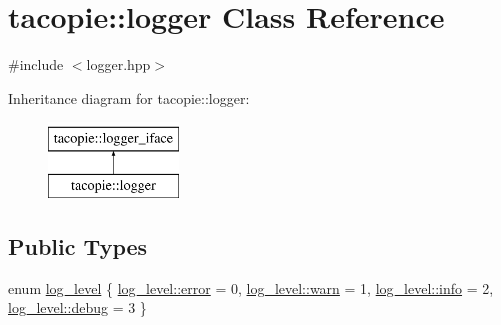 \hypertarget{classtacopie_1_1logger}{}\section{tacopie\+:\+:logger Class Reference}
\label{classtacopie_1_1logger}


{\ttfamily \#include $<$logger.\+hpp$>$}

Inheritance diagram for tacopie\+:\+:logger\+:\begin{figure}[H]
\begin{center}
\leavevmode
\includegraphics[height=2.000000cm]{classtacopie_1_1logger}
\end{center}
\end{figure}
\subsection*{Public Types}
\begin{DoxyCompactItemize}
\item 
enum \hyperlink{classtacopie_1_1logger_ae7dd235972bbf86a017fc39b3af80efe}{log\+\_\+level} \{ \hyperlink{classtacopie_1_1logger_ae7dd235972bbf86a017fc39b3af80efeacb5e100e5a9a3e7f6d1fd97512215282}{log\+\_\+level\+::error} = 0, 
\hyperlink{classtacopie_1_1logger_ae7dd235972bbf86a017fc39b3af80efea1ea4c3ab05ee0c6d4de30740443769cb}{log\+\_\+level\+::warn} = 1, 
\hyperlink{classtacopie_1_1logger_ae7dd235972bbf86a017fc39b3af80efeacaf9b6b99962bf5c2264824231d7a40c}{log\+\_\+level\+::info} = 2, 
\hyperlink{classtacopie_1_1logger_ae7dd235972bbf86a017fc39b3af80efeaad42f6697b035b7580e4fef93be20b4d}{log\+\_\+level\+::debug} = 3
 \}
\end{DoxyCompactItemize}
